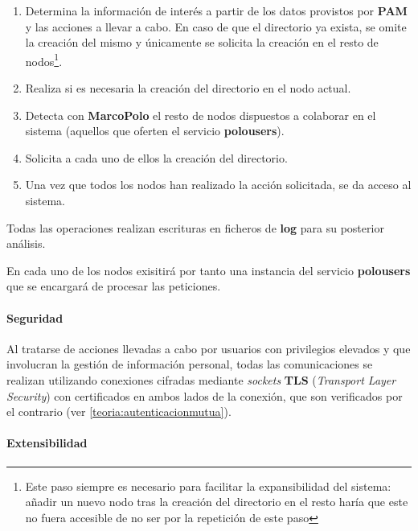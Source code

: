 \begin{enumerate}
	\item Determina la información de interés a partir de los datos provistos por \textbf{PAM} y las acciones a llevar a cabo. En caso de que el directorio ya exista, se omite la creación del mismo y únicamente se solicita la creación en el resto de nodos\footnote{Este paso siempre es necesario para facilitar la expansibilidad del sistema: añadir un nuevo nodo tras la creación del directorio en el resto haría que este no fuera accesible de no ser por la repetición de este paso}.
	
	\item Realiza si es necesaria la creación del directorio en el nodo actual.
	
	\item Detecta con \textbf{MarcoPolo} el resto de nodos dispuestos a colaborar en el sistema (aquellos que oferten el servicio \textbf{polousers}).
	
	\item Solicita a cada uno de ellos la creación del directorio.
	
	\item Una vez que todos los nodos han realizado la acción solicitada, se da acceso al sistema.
\end{enumerate}

Todas las operaciones realizan escrituras en ficheros de \textbf{log} para su posterior análisis.

En cada uno de los nodos exisitirá por tanto una instancia del servicio \textbf{polousers} que se encargará de procesar las peticiones.

\paragraph{Seguridad\\}

Al tratarse de acciones llevadas a cabo por usuarios con privilegios elevados y que involucran la gestión de información personal, todas las comunicaciones se realizan utilizando conexiones cifradas mediante \textit{sockets} \textbf{TLS} (\textit{Transport Layer Security}) con certificados en ambos lados de la conexión, que son verificados por el contrario (ver \ref{teoria:autenticacionmutua}).

\paragraph{Extensibilidad\\}

